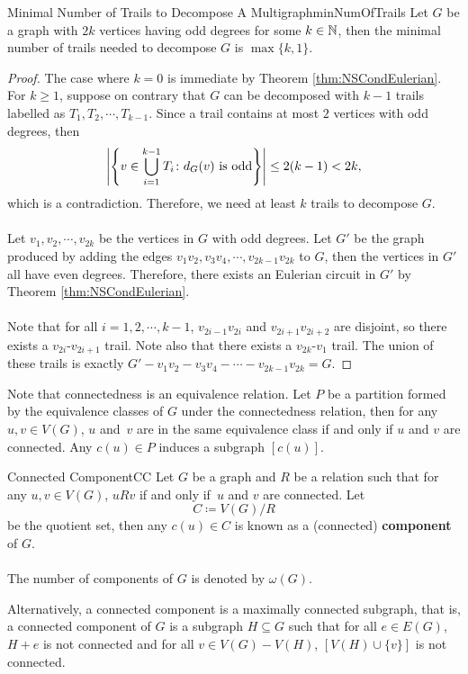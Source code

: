 \documentclass[math, code]{amznotes}
\theoremstyle{remark}
\begin{document}
\begin{probox}{Minimal Number of Trails to Decompose A Multigraph}{minNumOfTrails}
    Let $G$ be a graph with $2k$ vertices having odd degrees for some $k \in \mathbb{N}$, then the minimal number of trails needed to decompose $G$ is $\max\{k, 1\}$.
    \tcblower
    \begin{proof}
        The case where $k = 0$ is immediate by Theorem \ref{thm:NSCondEulerian}. For $k \geq 1$, suppose on contrary that $G$ can be decomposed with $k - 1$ trails labelled as $T_1, T_2, \cdots, T_{k - 1}$. Since a trail contains at most $2$ vertices with odd degrees, then
        \begin{equation*}
            {\left\lvert {\left\{v \in \bigcup_{i = 1}^{k - 1}T_i \colon d_G(v) \textrm{ is odd}\right\}} \right\rvert} \leq 2(k - 1) < 2k,
        \end{equation*}
        which is a contradiction. Therefore, we need at least $k$ trails to decompose $G$. 
        \\\\
        Let $v_1, v_2, \cdots, v_{2k}$ be the vertices in $G$ with odd degrees. Let $G'$ be the graph produced by adding the edges $v_1v_2, v_3v_4, \cdots, v_{2k - 1}v_{2k}$ to $G$, then the vertices in $G'$ all have even degrees. Therefore, there exists an Eulerian circuit in $G'$ by Theorem \ref{thm:NSCondEulerian}.
        \\\\
        Note that for all $i = 1, 2, \cdots, k - 1$, $v_{2i - 1}v_{2i}$ and $v_{2i + 1}v_{2i + 2}$ are disjoint, so there exists a $v_{2i}$-$v_{2i + 1}$ trail. Note also that there exists a $v_{2k}$-$v_1$ trail. The union of these trails is exactly $G' - v_1v_2 - v_3v_4 - \cdots - v_{2k - 1}v_{2k} = G$.
    \end{proof}
\end{probox}
Note that connectedness is an equivalence relation. Let $P$ be a partition formed by the equivalence classes of $G$ under the connectedness relation, then for any $u, v \in V(G)$, $u$ and~$v$ are in the same equivalence class if and only if $u$ and $v$ are connected. Any $c(u) \in P$ induces a subgraph $[c(u)]$.
\begin{dfnbox}{Connected Component}{CC}
    Let $G$ be a graph and $R$ be a relation such that for any $u, v \in V(G)$, $uRv$ if and only if~$u$ and $v$ are connected. Let
    \begin{equation*}
        C \coloneqq V(G)/R
    \end{equation*}
    be the quotient set, then any $c(u) \in C$ is known as a (connected) {\color{red} \textbf{component}} of $G$.
    \\\\
    The number of components of $G$ is denoted by $\omega(G)$.
\end{dfnbox}
Alternatively, a connected component is a maximally connected subgraph, that is, a connected component of $G$ is a subgraph $H \subseteq G$ such that for all $e \in E(G)$, $H + e$ is not connected and for all $v \in V(G) - V(H)$, $\left[V(H) \cup \{v\}\right]$ is not connected.
\end{document}
